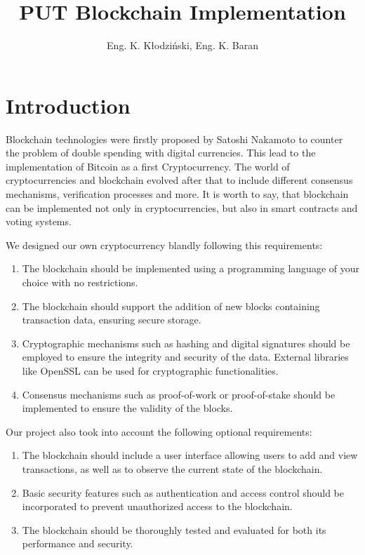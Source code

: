 \documentclass{article}
\title{PUT Blockchain Implementation}
\author{Eng. K. Kłodziński, Eng. K. Baran}
\begin{document}
\maketitle
\newpage

\tableofcontents
\newpage

\part{Introduction}
Blockchain technologies were firstly proposed by Satoshi Nakamoto to counter the problem of double spending with digital currencies. This lead to the implementation of Bitcoin as a first Cryptocurrency. The world of cryptocurrencies and blockchain evolved after that to include different consensus mechanisms, verification processes and more. It is worth to say, that blockchain can be implemented not only in cryptocurrencies, but also in smart contracts and voting systems. \\ \par
We designed our own cryptocurrency blandly following this requirements:
\begin{enumerate}
	\item The blockchain should be implemented using a programming language of your choice with no restrictions.
	\item The blockchain should support the addition of new blocks containing transaction data, ensuring secure storage.
	\item Cryptographic mechanisms such as hashing and digital signatures should be employed to ensure the integrity and security of the data. External libraries like OpenSSL can be used for cryptographic functionalities.
	\item Consensus mechanisms such as proof-of-work or proof-of-stake should be implemented to ensure the validity of the blocks.
\end{enumerate}

Our project also took into account the following optional requirements:
\begin{enumerate}
	\item The blockchain should include a user interface allowing users to add and view transactions, as well as to observe the current state of the blockchain.
	\item Basic security features such as authentication and access control should be incorporated to prevent unauthorized access to the blockchain.
	\item The blockchain should be thoroughly tested and evaluated for both its performance and security.
\end{enumerate}
\end{document}
